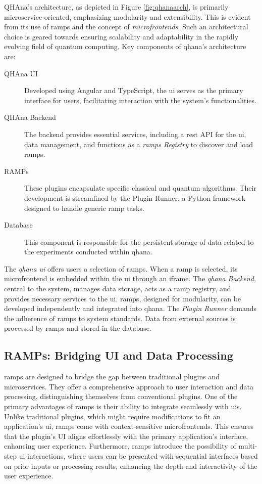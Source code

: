 \documentclass[
  a4paper,  %
  twoside,  %
  bibliography=totoc,
  headsepline,
  cleardoublepage=empty,
  parskip=half,
  draft=false
]{scrbook}
\begin{document}
QHAna's architecture, as depicted in Figure \ref{fig:qhanaarch}, is primarily microservice-oriented, emphasizing modularity and extensibility.
This is evident from its use of \glspl{ramp} and the concept of \emph{microfrontends}.
Such an architectural choice is geared towards ensuring scalability and adaptability in the rapidly evolving field of quantum computing.
Key components of \gls{qhana}'s architecture are:
\begin{description}
  \item[QHAna UI] Developed using Angular and TypeScript, the \gls{ui} serves as the primary interface for users, facilitating interaction with the system's functionalities.
  \item[QHAna Backend] The backend provides essential services, including a \gls{rest} API for the \gls{ui}, data management, and functions as a \emph{\glspl{ramp} Registry} to discover and load \glspl{ramp}.
  \item[RAMPs] These plugins encapsulate specific classical and quantum algorithms. Their development is streamlined by the Plugin Runner, a Python framework designed to handle generic \gls{ramp} tasks.
  \item[Database] This component is responsible for the persistent storage of data related to the experiments conducted within \gls{qhana}.
\end{description}

The \emph{\gls{qhana} \gls{ui}} offers users a selection of \glspl{ramp}.
When a \gls{ramp} is selected, its microfrontend is embedded within the \gls{ui} through an iframe.
The \emph{\gls{qhana} Backend}, central to the system, manages data storage, acts as a \gls{ramp} registry, and provides necessary services to the \gls{ui}.
\glspl{ramp}, designed for modularity, can be developed independently and integrated into \gls{qhana}.
The \emph{Plugin Runner} demands the adherence of \glspl{ramp} to system standards.
Data from external sources is processed by \glspl{ramp} and stored in the database.

\subsection{RAMPs: Bridging UI and Data Processing}
\label{subsec:ramps}

\glspl{ramp} are designed to bridge the gap between traditional plugins and microservices.
They offer a comprehensive approach to user interaction and data processing, distinguishing themselves from conventional plugins.
One of the primary advantages of \glspl{ramp} is their ability to integrate seamlessly with \glspl{ui}.
Unlike traditional plugins, which might require modifications to fit an application's \gls{ui}, \glspl{ramp} come with context-sensitive microfrontends.
This ensures that the plugin's \gls{UI} aligns effortlessly with the primary application's interface, enhancing user experience.
Furthermore, \glspl{ramp} introduce the possibility of multi-step \gls{ui} interactions, where users can be presented with sequential interfaces based on prior inputs or processing results, enhancing the depth and interactivity of the user experience.
\end{document}

